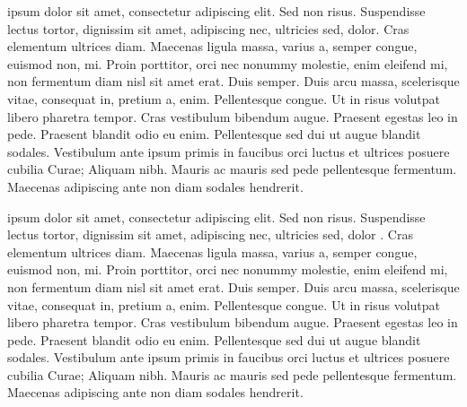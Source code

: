 \documentclass{article}
\begin{document}




       ipsum dolor sit amet, consectetur adipiscing elit. Sed non risus. Suspendisse lectus tortor, dignissim sit amet, adipiscing nec, ultricies sed, dolor. Cras elementum ultrices diam. Maecenas ligula massa, varius a, semper congue, euismod non, mi. Proin porttitor, orci nec nonummy molestie, enim  eleifend mi, non fermentum diam nisl sit amet erat. Duis semper. Duis arcu massa, scelerisque vitae, consequat in, pretium a, enim. Pellentesque congue. Ut in risus volutpat libero pharetra tempor. Cras vestibulum bibendum augue. Praesent egestas leo in pede. Praesent blandit odio eu enim. Pellentesque sed dui ut augue blandit sodales. Vestibulum ante ipsum primis in faucibus orci luctus et ultrices posuere cubilia Curae; Aliquam nibh. Mauris ac mauris sed pede pellentesque fermentum. Maecenas adipiscing ante non diam sodales hendrerit. 








       ipsum dolor sit amet, consectetur adipiscing elit. Sed non risus. Suspendisse lectus tortor, dignissim sit amet, adipiscing nec, ultricies sed, dolor \thepage. Cras elementum ultrices diam. Maecenas ligula massa, varius a, semper congue, euismod non, mi. Proin porttitor, orci nec nonummy molestie, enim  eleifend mi, non fermentum diam nisl sit amet erat. Duis semper. Duis arcu massa, scelerisque vitae, consequat in, pretium a, enim. Pellentesque congue. Ut in risus volutpat libero pharetra tempor. Cras vestibulum bibendum augue. Praesent egestas leo in pede. Praesent blandit odio eu enim. Pellentesque sed dui ut augue blandit sodales. Vestibulum ante ipsum primis in faucibus orci luctus et ultrices posuere cubilia Curae; Aliquam nibh. Mauris ac mauris sed pede pellentesque fermentum. Maecenas adipiscing ante non diam sodales hendrerit. 



\end{document}
